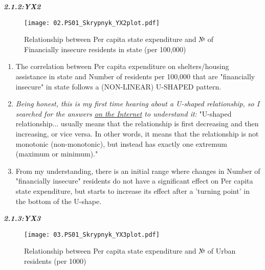 \documentclass[12pt,letterpaper]{article}
\begin{document}
\noindent \begin{center}
	\textbf {\textit{2.1.2:YX2}}
\end{center}

\begin{figure}[H]
	\centering
	\caption{\footnotesize Relationship between Per capita state expenditure and № of Financially insecure residents in state (per 100,000)}
	\label{fig:plot_2}
	\texttt{[image: 02.PS01\_Skrypnyk\_YX2plot.pdf]}
\end{figure}


\begin{enumerate}[$\circ$]
	\item The correlation between Per capita expenditure on shelters/housing assistance in state and Number of residents per 100,000 that are "financially insecure" in state follows a (NON-LINEAR) U-SHAPED pattern.
	
	\item \textit {Being honest, this is my first time hearing about a U-shaped relationship, so I searched for the answers \href{https://stats.stackexchange.com/questions/315076/what-is-a-strict-definition-of-u-shaped-relationship}{on the Internet} to understand it:}
	"U-shaped relationship... usually means that the relationship is first decreasing and then increasing, or vice versa. In other words, it means that the relationship is not monotonic (non-monotonic), but instead has exactly one extremum (maximum or minimum)." 
	
	\item From my understanding, there is an initial range where changes in Number of "financially insecure" residents do not have a significant effect on Per capita state expenditure, but starts to increase its effect after a 'turning point' in the bottom of the U-shape.
		\vspace{3cm}

\end{enumerate}

\noindent \begin{center}
	\textbf {\textit{2.1.3:YX3}}
\end{center}

\begin{figure}[H]
	\centering
	\caption{\footnotesize Relationship between Per capita state expenditure and № of Urban residents (per 1000)}
	\label{fig:plot_3}
	\texttt{[image: 03.PS01\_Skrypnyk\_YX3plot.pdf]}
\end{figure}
\end{document}
